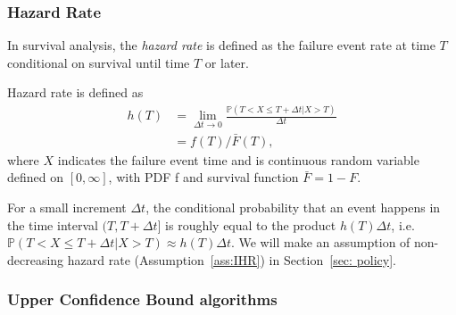 \subsubsection{Hazard Rate}
\label{subsec: Hazard Rate}

In survival analysis, the \textit{hazard rate} is defined as the failure event rate at time $T$ conditional on survival until time $T$ or later.



\begin{defi} 
\label{defi: Hazard Rate}
Hazard rate is defined as
 \begin{align}
     h(T)&=\lim _{\Delta t \rightarrow 0} \frac{\mathbb{P}\left(T < X \leq T + \Delta t |  X > T\right)}{\Delta t}\\
     &=f\left(T\right)/\bar{F}\left(T\right),
 \end{align}
where $X$ indicates the failure event time and is continuous random variable defined on $[0, \infty]$, with PDF f and survival function $\bar{F} = 1 - F$.
\end{defi}

For a small increment $\Delta t$, the conditional probability that an event happens in the time interval $(T, T + \Delta t]$ is roughly equal to the product $h(T) \Delta t$, i.e. $\mathbb{P}\left(T < X \leq T + \Delta t |  X > T\right) \approx h(T) \Delta t$.
We will make an assumption of non-decreasing hazard rate (Assumption~\ref{ass:IHR})
in Section~\ref{sec: policy}.

\subsubsection{Upper Confidence Bound algorithms}
\label{subsec: MAB background}

